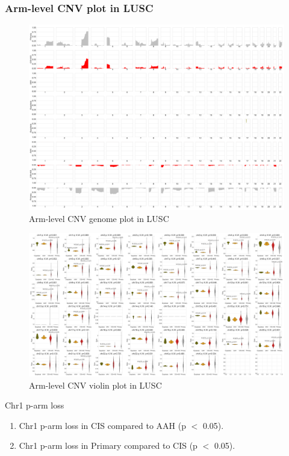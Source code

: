 \documentclass{beamer}
\begin{document}
            \begin{frame}[allowframebreaks]
                \frametitle{Arm-level CNV plot in LUSC}

                \begin{figure}
                    \includegraphics[width=0.7 \linewidth]{figures/Sequenza/BWA-simple-SQC.pdf}
                    \caption{Arm-level CNV genome plot in LUSC}
                \end{figure}

                \begin{figure}
                    \includegraphics[width=0.8 \linewidth]{figures/Sequenza/BWA-violin-SQC.pdf}
                    \caption{Arm-level CNV violin plot in LUSC}
                \end{figure}

                \begin{block}{Chr1 p-arm loss}
                    \begin{enumerate}
                        \item Chr1 p-arm loss in CIS compared to AAH (p $<$ 0.05).
                        \item Chr1 p-arm loss in Primary compared to CIS (p $<$ 0.05).
                    \end{enumerate}


\end{block}
\end{frame}
\end{document}
